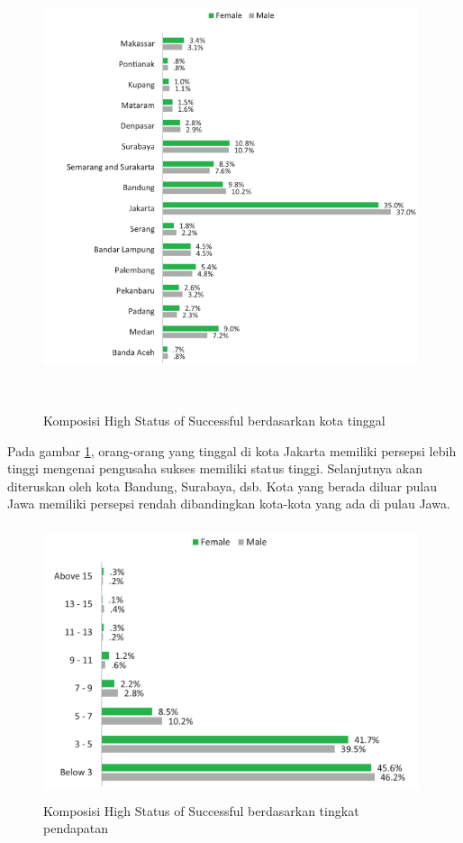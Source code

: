 \begin{enumerate}
\begin{figure} [H]
	\centering  
	\includegraphics[width=11cm, height=13cm]{lokasiHS2013} 
	\caption[Komposisi High Status of Successful berdasarkan kota tinggal]{Komposisi High Status of Successful berdasarkan kota tinggal} 
	\label{fig:lokasiHS} 
\end{figure} 

Pada gambar \ref{fig:lokasiHS}, orang-orang yang tinggal di kota Jakarta memiliki persepsi lebih tinggi mengenai pengusaha sukses memiliki status tinggi. Selanjutnya akan diteruskan oleh kota Bandung, Surabaya, dsb. Kota yang berada diluar pulau Jawa memiliki persepsi rendah dibandingkan kota-kota yang ada di pulau Jawa.

\begin{figure} [H]
	\centering  
	\includegraphics[width=11cm, height=8cm]{pendapatanHS2013} 
	\caption[Komposisi High Status of Successful berdasarkan tingkat pendapatan]{Komposisi High Status of Successful berdasarkan tingkat pendapatan} 
	\label{fig:pendapatanHS} 
\end{figure} 


\end{enumerate}
